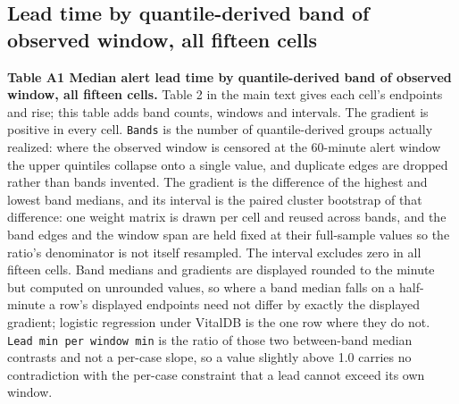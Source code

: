 \subsection{Lead time by quantile-derived band of observed window, all fifteen cells}\label{lead-time-by-quantile-derived-band-of-observed-window-all-fifteen-cells}

\begin{minipage}{\linewidth}
\textbf{Table A1 \textbar{} Median alert lead time by quantile-derived band of observed window, all fifteen
cells.} Table 2 in the main text gives each cell's endpoints and rise; this table adds band
counts, windows and intervals. The gradient is positive in
every cell.
\texttt{Bands} is the number of quantile-derived groups actually realized: where the observed window is censored
at the 60-minute alert window the upper quintiles collapse onto a single value, and
duplicate edges are dropped rather than bands invented.
The gradient is the difference of the highest and lowest band medians, and its interval is the
paired cluster bootstrap of that difference: one weight matrix is drawn per cell and reused
across bands, and the band edges and the window span are held fixed at their full-sample values
so the ratio's denominator is not itself resampled. The interval excludes zero in all fifteen
cells. Band medians and gradients are displayed rounded to the minute but computed on unrounded
values, so where a band median falls on a half-minute a row's displayed endpoints need not
differ by exactly the displayed gradient; logistic regression under VitalDB is the one row
where they do not. \texttt{Lead\ min\ per\ window\ min} is the ratio of those two between-band median contrasts and not
a per-case slope, so a value slightly above 1.0 carries no contradiction with the per-case
constraint that a lead cannot exceed its own window.


\end{minipage}
